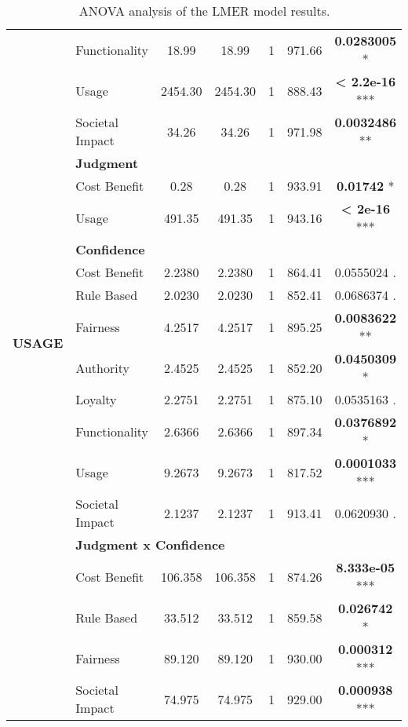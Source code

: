 \begin{table}[!hptb]
\begin{center}
\begin{tabular}{@{}llccccc@{}}
        & \quad Functionality & 18.99 & 18.99 & 1 & 971.66 & \textbf{0.0283005} * \\ 
        & \quad Usage & 2454.30 & 2454.30 & 1 & 888.43 & \textbf{< 2.2e-16} *** \\ 
        & \quad Societal Impact & 34.26 & 34.26 & 1 & 971.98 & \textbf{0.0032486} ** \\ 
        \midrule
        \multirow{12}{*}{\textbf{USAGE}} & \multicolumn{5}{l}{\textbf{Judgment}} \\ 
        & \quad Cost Benefit & 0.28 & 0.28 & 1 & 933.91 & \textbf{0.01742} * \\ 
        & \quad Usage & 491.35 & 491.35 & 1 & 943.16 & \textbf{< 2e-16} *** \\ 
        & \multicolumn{5}{l}{\textbf{Confidence}} \\ 
        & \quad Cost Benefit & 2.2380 & 2.2380 & 1 & 864.41 & 0.0555024 . \\ 
        & \quad Rule Based & 2.0230 & 2.0230 & 1 & 852.41 & 0.0686374 . \\ 
        & \quad Fairness & 4.2517 & 4.2517 & 1 & 895.25 & \textbf{0.0083622} ** \\ 
        & \quad Authority & 2.4525 & 2.4525 & 1 & 852.20 & \textbf{0.0450309} * \\ 
        & \quad Loyalty & 2.2751 & 2.2751 & 1 & 875.10 & 0.0535163 . \\ 
        & \quad Functionality & 2.6366 & 2.6366 & 1 & 897.34 & \textbf{0.0376892} * \\ 
        & \quad Usage & 9.2673 & 9.2673 & 1 & 817.52 & \textbf{0.0001033} *** \\ 
        & \quad Societal Impact & 2.1237 & 2.1237 & 1 & 913.41 & 0.0620930 . \\ 
        & \multicolumn{5}{l}{\textbf{Judgment x Confidence}} \\ 
        & \quad Cost Benefit & 106.358 & 106.358 & 1 & 874.26 & \textbf{8.333e-05} *** \\ 
        & \quad Rule Based & 33.512 & 33.512 & 1 & 859.58 & \textbf{0.026742} * \\ 
        & \quad Fairness & 89.120 & 89.120 & 1 & 930.00 & \textbf{0.000312} *** \\ 
        & \quad Societal Impact & 74.975 & 74.975 & 1 & 929.00 & \textbf{0.000938} *** \\ 
        \bottomrule
    \end{tabular}
    \caption{ANOVA analysis of the LMER model results.}
    \label{tab:reasoning-factors-judgment-anova}
    \end{center}
\end{table}

